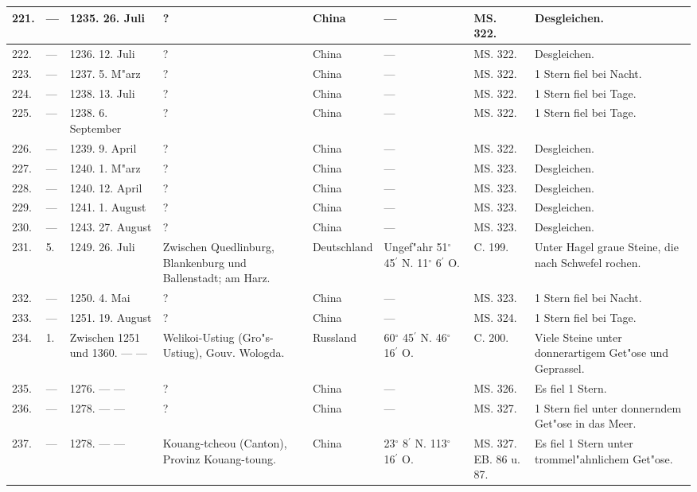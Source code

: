 \documentclass[a4paper, 8pt, oneside, polutonikogreek, german]{article}
\begin{document}
\begin{center}
\begin{longtable}{| p{5mm} | p{3mm} | p{15mm} | p{25mm} | p{20mm} | p{14mm} | p{17mm} | p{24mm} |}
        221. & --- & 1235. 26. Juli & ? & China & --- & MS. 322. & Desgleichen. \\ \hline
        222. & --- & 1236. 12. Juli & ? & China & --- & MS. 322. & Desgleichen. \\ \hline
        223. & --- & 1237. 5. M"arz & ? & China & --- & MS. 322. & 1 Stern fiel bei Nacht. \\ \hline
        224. & --- & 1238. 13. Juli & ? & China & --- & MS. 322. & 1 Stern fiel bei Tage. \\ \hline
        225. & --- & 1238. 6. September & ? & China & --- & MS. 322. & 1 Stern fiel bei Tage. \\ \hline
        226. & --- & 1239. 9. April & ? & China & --- & MS. 322. & Desgleichen. \\ \hline
        227. & --- & 1240. 1. M"arz & ? & China & --- & MS. 323. & Desgleichen. \\ \hline
        228. & --- & 1240. 12. April & ? & China & --- & MS. 323. & Desgleichen. \\ \hline
        229. & --- & 1241. 1. August & ? & China & --- & MS. 323. & Desgleichen. \\ \hline
        230. & --- & 1243. 27. August & ? & China & --- & MS. 323. & Desgleichen. \\ \hline
        231. & 5. & 1249. 26. Juli & Zwischen Quedlinburg, Blankenburg und Ballenstadt; am Harz. & Deutschland & Ungef"ahr 51$^\circ$ 45$^\prime$ N. 11$^\circ$ 6$^\prime$ O. & C. 199. & Unter Hagel graue Steine, die nach Schwefel rochen. \\ \hline
        232. & --- & 1250. 4. Mai & ? & China & --- & MS. 323. & 1 Stern fiel bei Nacht. \\ \hline
        233. & --- & 1251. 19. August & ? & China & --- & MS. 324. & 1 Stern fiel bei Tage. \\ \hline
        234. & 1. & Zwischen 1251 und 1360. --- --- & Welikoi-Ustiug (Gro"s-Ustiug), Gouv. Wologda. & Russland & 60$^\circ$ 45$^\prime$ N. 46$^\circ$ 16$^\prime$ O. & C. 200. & Viele Steine unter donnerartigem Get"ose und Geprassel. \\ \hline
        235. & --- & 1276. --- --- & ? & China & --- & MS. 326. & Es fiel 1 Stern. \\ \hline
        236. & --- & 1278. --- --- & ? & China & --- & MS. 327. & 1 Stern fiel unter donnerndem Get"ose in das Meer. \\ \hline
        237. & --- & 1278. --- --- & Kouang-tcheou (Canton), Provinz Kouang-toung. & China & 23$^\circ$ 8$^\prime$ N. 113$^\circ$ 16$^\prime$ O. & MS. 327. EB. 86 u. 87. & Es fiel 1 Stern unter trommel"ahnlichem Get"ose. \\ \hline

\end{longtable}
\end{center}
\end{document}
